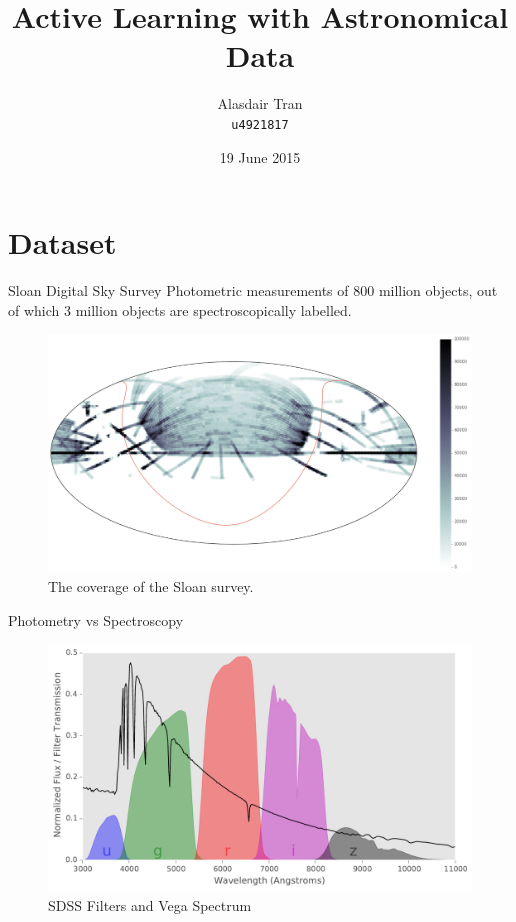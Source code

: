 \documentclass{beamer}
\title{Active Learning with Astronomical Data}
\subtitle{}
\institute{Supervisors: \\Cheng Soon Ong, Christian Wolf, Justin Domke}
\author[Alasdair Tran]{Alasdair Tran \\ \texttt{u4921817}}
\date{\footnotesize{19 June 2015}}
\begin{document}
	
\begin{frame}
	\titlepage
\end{frame}

\section{Dataset}
\begin{frame}{Sloan Digital Sky Survey}
	Photometric measurements of 800 million objects, out of which
	3 million objects are spectroscopically labelled.
	\begin{figure}
		\centering
		\includegraphics[width=\textwidth]{images/sdss_coverage}
		\caption{The coverage of the Sloan survey.}
	\end{figure}
\end{frame}


\begin{frame}{Photometry vs Spectroscopy}
	\begin{figure}
		\centering
		\includegraphics[width=\textwidth]{images/vega}
		\caption{SDSS Filters and Vega Spectrum}
	\end{figure}
\end{frame}
\end{document}
